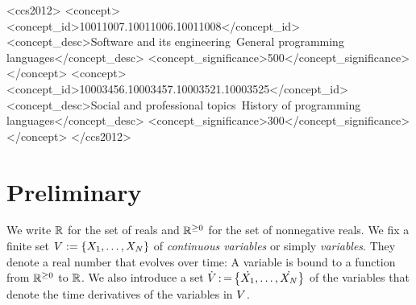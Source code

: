 \documentclass[acmsmall,review,anonymous]{acmart}\settopmatter{printfolios=true,printccs=false,printacmref=false}
\begin{document}
\begin{abstract}
\end{abstract}



\begin{CCSXML}
<ccs2012>
<concept>
<concept_id>10011007.10011006.10011008</concept_id>
<concept_desc>Software and its engineering~General programming languages</concept_desc>
<concept_significance>500</concept_significance>
</concept>
<concept>
<concept_id>10003456.10003457.10003521.10003525</concept_id>
<concept_desc>Social and professional topics~History of programming languages</concept_desc>
<concept_significance>300</concept_significance>
</concept>
</ccs2012>
\end{CCSXML}





\maketitle

% 
% 
% 
% 
% 
% 
% 
% 

% 

\section{Preliminary}

We write $\mathbb{R}$ for the set of reals and $\mathbb{R}^{{} \ge 0}$ for the set of
nonnegative reals.  We fix a finite set
$V := \left\{{X_1,\dots,X_N}\right\}$ of \emph{continuous
  variables} or simply \emph{variables}.  They denote a real number
that evolves over time: A variable is bound to a function from
$\mathbb{R}^{{} \ge 0}$ to $\mathbb{R}$.
We also introduce a set
$\dot{V} \operatorname{{:=}}
\left\{{\dot{X_1},\dots,\dot{X_N}}\right\}$ of the variables
that denote the time derivatives of the variables in $V$.
\end{document}
